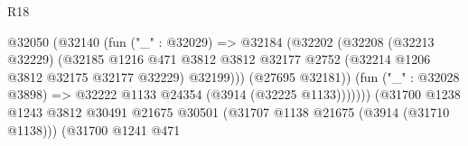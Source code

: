 \begin{lexlean}{R18}
\begin{coremodule}
                                                      @32050
                                                        (@32140
                                                          (fun ("_" : @32029) =>
                                                          @32184
                                                            (@32202
                                                              (@32208
                                                                (@32213 @32229)
                                                                (@32185
                                                                  @1216
                                                                  @471
                                                                  @3812
                                                                  @3812
                                                                  @32177
                                                                  @2752
                                                                  (@32214
                                                                    @1206
                                                                    @3812
                                                                    @32175
                                                                    @32177
                                                                    @32229)
                                                                  @32199)))
                                                            (@27695 @32181))
                                                          (fun ("_" : @32028 @3898) =>
                                                          @32222
                                                            @1133
                                                            @24354
                                                            (@3914 (@32225 @1133)))))))
                                                  (@31700
                                                    @1238
                                                    @1243
                                                    @3812
                                                    @30491
                                                    @21675
                                                    @30501
                                                    (@31707 @1138 @21675 (@3914 (@31710 @1138)))
                                                    (@31700
                                                      @1241
                                                      @471

\end{coremodule}
\end{lexlean}
